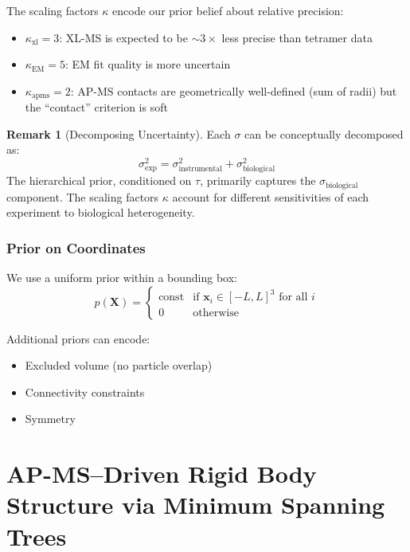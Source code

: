 \documentclass[11pt,a4paper]{article}
\newcommand{\bx}{\mathbf{x}}
\newcommand{\bX}{\mathbf{X}}
\theoremstyle{definition}
\newtheorem{remark}{Remark}
\begin{document}
The scaling factors $\kappa$ encode our prior belief about relative precision:
\begin{itemize}
    \item $\kappa_{\text{xl}} = 3$: XL-MS is expected to be $\sim 3\times$ less precise than tetramer data
    \item $\kappa_{\text{EM}} = 5$: EM fit quality is more uncertain
    \item $\kappa_{\text{apms}} = 2$: AP-MS contacts are geometrically well-defined (sum of radii) but the ``contact'' criterion is soft
\end{itemize}

\begin{remark}[Decomposing Uncertainty]
Each $\sigma$ can be conceptually decomposed as:
\begin{equation}
    \sigma_{\text{exp}}^2 = \sigma_{\text{instrumental}}^2 + \sigma_{\text{biological}}^2
\end{equation}
The hierarchical prior, conditioned on $\tau$, primarily captures the $\sigma_{\text{biological}}$ component. The scaling factors $\kappa$ account for different sensitivities of each experiment to biological heterogeneity.
\end{remark}

\subsubsection{Prior on Coordinates}

We use a uniform prior within a bounding box:
\begin{equation}
    p(\bX) = \begin{cases}
        \text{const} & \text{if } \bx_i \in [-L, L]^3 \text{ for all } i \\
        0 & \text{otherwise}
    \end{cases}
\end{equation}

Additional priors can encode:
\begin{itemize}
    \item Excluded volume (no particle overlap)
    \item Connectivity constraints
    \item Symmetry
\end{itemize}

\section{AP-MS--Driven Rigid Body Structure via Minimum Spanning Trees}
\label{sec:mst}
\end{document}
